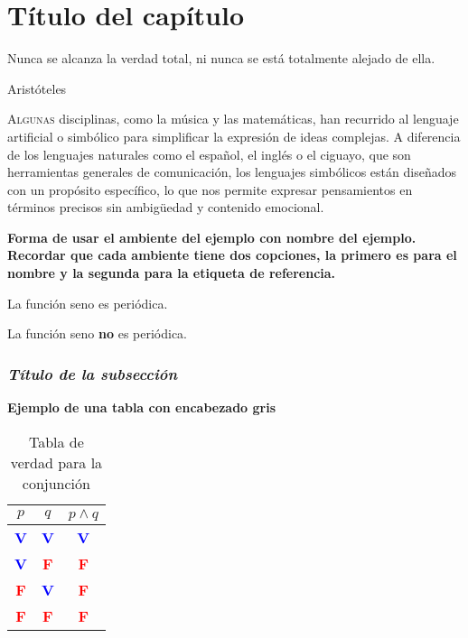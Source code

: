 \chapter{Título del capítulo}\label{cap:02}
\pagecolor{white}
\BgThispage
\thispagestyle{empty}
\pagestyle{isfodosuCD}
\epigraph{Nunca se alcanza la verdad total, ni nunca se está totalmente alejado de ella.}{Aristóteles}

\lettrine[lraise=0, lines=4, loversize=0]{\textcolor{azulF}{A}}{lgunas} disciplinas, como la música y las matemáticas, 
han recurrido al lenguaje artificial o simbólico para simplificar la expresión de ideas complejas. A diferencia de los 
lenguajes naturales como el español, el inglés o el ciguayo, que son herramientas generales de comunicación, los 
lenguajes simbólicos están diseñados con un propósito específico, lo que nos permite expresar pensamientos en términos 
precisos sin ambigüedad y contenido emocional.



\textbf{Forma de usar el ambiente del ejemplo con nombre del ejemplo. Recordar que cada ambiente tiene dos copciones, 
la primero es para el nombre y la segunda para la etiqueta de referencia.}
\begin{ejem}[\;\;(Negación)][ejem:02:03]
\centering
La función seno es periódica.

\smallskip

La función seno \textcolor{Naranja}{\textbf{no}} es periódica.
\end{ejem}


\subsection{\textit{Título de la subsección}}

\textbf{Ejemplo de una tabla con encabezado gris}

\begin{table}[H]
\begin{tabular}{c|c|c}
\rowcolor{gray!20}$p$ & $q$ & $p\wedge q$\\
\toprule
\textcolor{blue}{\textbf{V}} & \textcolor{blue}{\textbf{V}} & \textcolor{blue}{\textbf{V}}\\
\textcolor{blue}{\textbf{V}} & \textcolor{red}{\textbf{F}} & \textcolor{red}{\textbf{F}}\\
\textcolor{red}{\textbf{F}} & \textcolor{blue}{\textbf{V}} & \textcolor{red}{\textbf{F}}\\
\textcolor{red}{\textbf{F}} & \textcolor{red}{\textbf{F}} & \textcolor{red}{\textbf{F}}\\
\toprule
\end{tabular}
\caption{Tabla de verdad para la conjunción}\label{tab:02:03}
\end{table}

